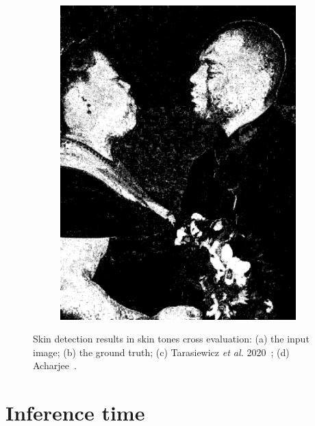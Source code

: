 \begin{figure}[h]
{\begin{subfigure}[b]{0.23\textwidth}
         \includegraphics[width=\textwidth]{images/results/cross_st/mike_light_dark_bayes.png}
         \caption{}
     \end{subfigure}}
\caption{Skin detection results in skin tones cross evaluation: (a) the input image; (b) the ground truth; (c) Tarasiewicz \textit{et al.} 2020~\cite{tarasiewicz2020skinny}; (d) Acharjee~\cite{acharjee2018skin}.}
\label{fig:cross-skintones-samples}
\end{figure}%


\FloatBarrier
\section{Inference time}

